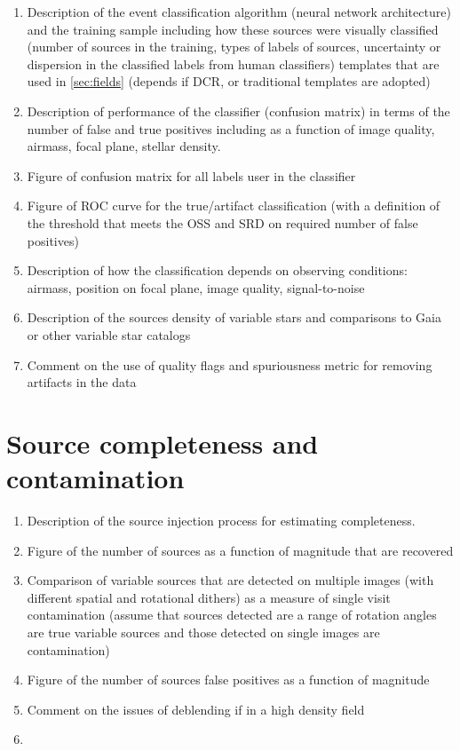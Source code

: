 \begin{enumerate}

    \item Description of the event classification algorithm (neural network architecture) and the training sample including how these sources were
    visually classified (number of sources in the training, types of labels of sources, uncertainty or dispersion in the classified labels from human classifiers)
    templates that are used in \ref{sec:fields} (depends if DCR, or traditional templates are adopted)
    \item Description of performance of the classifier (confusion matrix) in terms of the number of false and true positives including as a function 
    of image quality, airmass, focal plane, stellar density.
    \item Figure of confusion matrix for all labels user in the classifier
    \item Figure of ROC curve for the true/artifact classification (with a definition of the threshold that meets the OSS and SRD on required number of false positives)
    \item Description of how the classification depends on observing conditions: airmass, position on focal plane, image quality, signal-to-noise
    \item Description of the sources density of variable stars and comparisons to Gaia or other variable star catalogs
    \item Comment on the use of quality flags and spuriousness metric for removing artifacts in the data
    
\end{enumerate}

\section{Source completeness and contamination}

\begin{enumerate}

    \item Description of the source injection process for estimating completeness.
    \item Figure of the number of sources as a function of magnitude that are recovered
    \item Comparison of variable sources that are detected on multiple images (with different spatial and rotational dithers) as a measure of single
    visit contamination (assume that sources detected are a range of rotation angles are true variable sources and those detected on single images are 
    contamination)
    \item Figure of the number of sources false positives as a function of magnitude
    \item Comment on the issues of deblending if in a high density field
    \item 
\end{enumerate}

